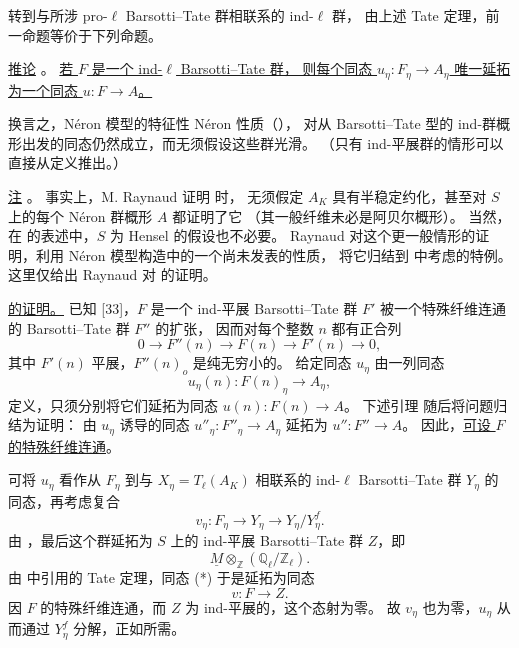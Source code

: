 转到与所涉 pro-$\ell$ Barsotti--Tate 群相联系的 ind-$\ell$ 群，
由上述 Tate 定理，前一命题等价于下列命题。

\medskip
\noindent
\underline{推论} 。
\underline{若 $F$ 是一个 ind-$\ell$ Barsotti--Tate 群，
则每个同态 $u_\eta:F_\eta\longrightarrow A_\eta$ 唯一延拓为一个同态 $u:F\longrightarrow A$。}

换言之，N\'eron 模型的特征性 N\'eron 性质（），
对从 Barsotti--Tate 型的 ind-群概形出发的同态仍然成立，而无须假设这些群光滑。
（只有 ind-平展群的情形可以直接从定义推出。）

\medskip
\noindent
\underline{注} 。
事实上，M. Raynaud 证明  时，
无须假定 $A_K$ 具有半稳定约化，甚至对 $S$ 上的每个 N\'eron 群概形 $A$ 都证明了它
（其一般纤维未必是阿贝尔概形）。
当然，在  的表述中，$S$ 为 Hensel 的假设也不必要。
Raynaud 对这个更一般情形的证明，利用 N\'eron 模型构造中的一个尚未发表的性质，
将它归结到  中考虑的特例。
这里仅给出 Raynaud 对  的证明。

\medskip
\noindent
\underline{ 的证明。}
已知 [33]，$F$ 是一个 ind-平展 Barsotti--Tate 群 $F'$ 被一个特殊纤维连通的 Barsotti--Tate 群 $F''$ 的扩张，
因而对每个整数 $n$ 都有正合列
\[
 0\longrightarrow F''(n)\longrightarrow F(n)
 \longrightarrow F'(n)\longrightarrow0,
\]
其中 $F'(n)$ 平展，$F''(n)_o$ 是纯无穷小的。
给定同态 $u_\eta$ 由一列同态
\[
 u_\eta(n):F(n)_\eta\longrightarrow A_\eta,
\]
定义，只须分别将它们延拓为同态 $u(n):F(n)\longrightarrow A$。
下述引理  随后将问题归结为证明：
由 $u_\eta$ 诱导的同态 $u''_\eta:F''_\eta\longrightarrow A_\eta$
延拓为 $u'':F''\longrightarrow A$。
因此，\underline{可设 $F$ 的特殊纤维连通}。

可将 $u_\eta$ 看作从 $F_\eta$ 到与 $X_\eta=T_\ell(A_K)$ 相联系的
ind-$\ell$ Barsotti--Tate 群 $Y_\eta$ 的同态，再考虑复合
\begin{equation}\tag{*}
 v_\eta:F_\eta\longrightarrow Y_\eta
 \longrightarrow Y_\eta/Y_\eta^f.
\end{equation}
由 ，最后这个群延拓为 $S$ 上的 ind-平展 Barsotti--Tate 群 $Z$，即
\[
 \underline M\otimes_{\mathbb Z}(\mathbb Q_\ell/\mathbb Z_\ell).
\]
由  中引用的 Tate 定理，同态 (*) 于是延拓为同态
\[
 v:F\longrightarrow Z.
\]
因 $F$ 的特殊纤维连通，而 $Z$ 为 ind-平展的，这个态射为零。
故 $v_\eta$ 也为零，$u_\eta$ 从而通过 $Y_\eta^f$ 分解，正如所需。


